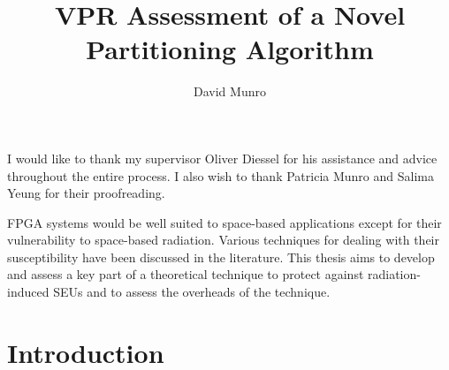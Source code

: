 \documentclass[12pt,final,oneside]{dwThesis} %
\title{VPR Assessment of a Novel Partitioning Algorithm}
\author{David Munro}
\begin{document}
   \maketitle

   \begin{acknowledgements}
      I would like to thank my supervisor Oliver Diessel
      for his assistance and advice throughout the entire process. I also wish
      to thank Patricia Munro and Salima Yeung for their proofreading.


   \end{acknowledgements}

   \begin{abstracts}
      \gls{FPGA} systems would be well
      suited to space-based applications except for their vulnerability to
      space-based radiation. Various techniques for dealing with their
      susceptibility have been discussed in the literature. This thesis aims to
      develop and assess a key part of a theoretical technique to protect
      against radiation-induced \glspl{SEU} and to assess the overheads of the
      technique.  \glsresetall 
   \end{abstracts}
   \newpage \tableofcontents*
   \listoffixmes \newpage \printglossaries 
   \chapter{Introduction}

\end{document}
